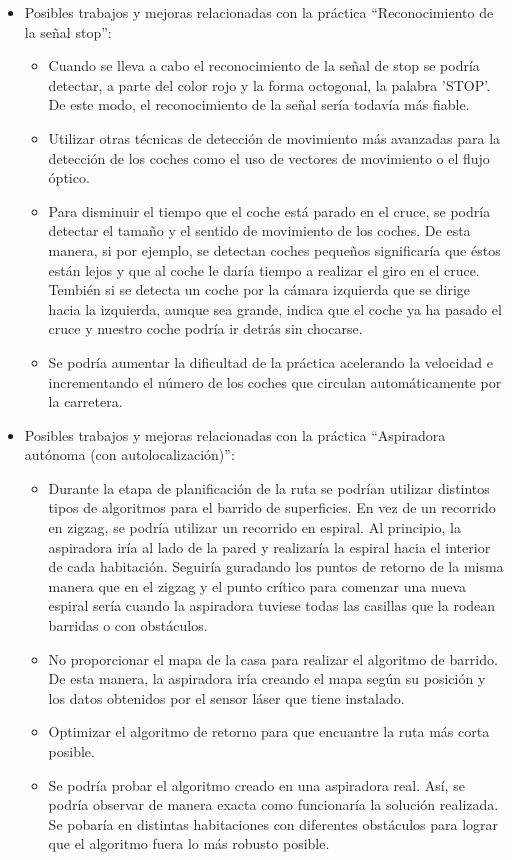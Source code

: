\begin{itemize}
\item Posibles trabajos y mejoras relacionadas con la práctica ``Reconocimiento de la señal stop'':

	\begin{itemize}
	\item Cuando se lleva a cabo el reconocimiento de la señal de stop se podría detectar, a parte del color rojo y la forma octogonal, la palabra 'STOP'. De este modo, el reconocimiento de la señal sería todavía más fiable.
	\item Utilizar otras técnicas de detección de movimiento más avanzadas para la detección de los coches como el uso de vectores de movimiento o el flujo óptico.
	\item Para disminuir el tiempo que el coche está parado en el cruce, se podría detectar el tamaño y el sentido de movimiento de los coches. De esta manera, si por ejemplo, se detectan coches pequeños significaría que éstos están lejos y que al coche le daría tiempo a realizar el giro en el cruce. Tembién si se detecta un coche por la cámara izquierda que se dirige hacia la izquierda, aunque sea grande, indica que el coche ya ha pasado el cruce y nuestro coche podría ir detrás sin chocarse.
	\item Se podría aumentar la dificultad de la práctica acelerando la velocidad e incrementando el número de los coches que circulan automáticamente por la carretera.
	\end{itemize}
	
\item Posibles trabajos y mejoras relacionadas con la práctica ``Aspiradora autónoma (con autolocalización)'':

	\begin{itemize}
	\item Durante la etapa de planificación de la ruta se podrían utilizar distintos tipos de algoritmos para el barrido de superficies. En vez de un recorrido en zigzag, se podría utilizar un recorrido en espiral. Al principio, la aspiradora iría al lado de la pared y realizaría la espiral hacia el interior de cada habitación. Seguiría guradando los puntos de retorno de la misma manera que en el zigzag y el punto crítico para comenzar una nueva espiral sería cuando la aspiradora tuviese todas las casillas que la rodean barridas o con obstáculos.
	\item No proporcionar el mapa de la casa para realizar el algoritmo de barrido. De esta manera, la aspiradora iría creando el mapa según su posición y los datos obtenidos por el sensor láser que tiene instalado.
	\item Optimizar el algoritmo de retorno para que encuantre la ruta más corta posible.
	\item Se podría probar el algoritmo creado en una aspiradora real. Así, se podría observar de manera exacta como funcionaría la solución realizada. Se pobaría en distintas habitaciones con diferentes obstáculos para lograr que el algoritmo fuera lo más robusto posible. 
	\end{itemize}
\end{itemize}


